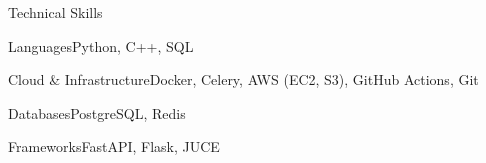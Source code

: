 \documentclass[
	11pt
]{../../../template}
\begin{document}
	\begin{rSection}{T}{echnical Skills}
		\begin{rSet}{Languages}{Python, C++, SQL}
		\end{rSet}
		\begin{rSet}{Cloud \& Infrastructure}{Docker, Celery, AWS (EC2, S3), GitHub Actions, Git}
		\end{rSet}
		\begin{rSet}{Databases}{PostgreSQL, Redis}
		\end{rSet}
		\begin{rSet}{Frameworks}{FastAPI, Flask, JUCE}
		\end{rSet}
	\end{rSection}
\end{document}
